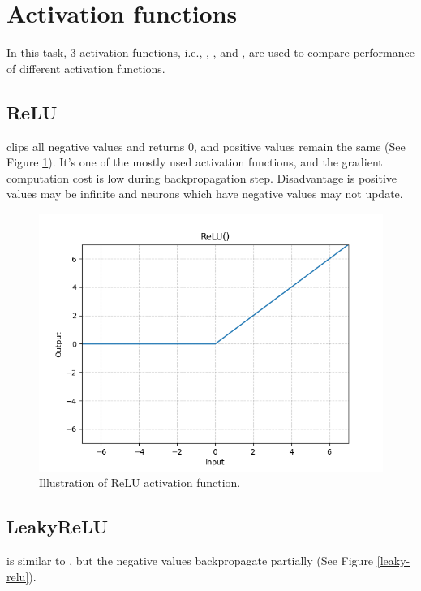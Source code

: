 \section{Activation functions}
\indent
    In this task, 3 activation functions, i.e., , , and , 
    are used to compare performance of different activation functions.

\subsection{ReLU}
\indent
     clips all negative values and returns 0, and positive values remain the same  (See Figure \ref{relu}). 
    It's one of the mostly used activation functions, and the gradient computation cost is low during backpropagation step.
    Disadvantage is positive values may be infinite and neurons which have negative values may not update.

    \begin{figure}[H]
		\centering
		\includegraphics[scale=0.5]{img/relu.png}
		\caption{Illustration of ReLU activation function.}
		\label{relu}
	\end{figure}

\subsection{LeakyReLU}
\indent
     is similar to , but the negative values backpropagate partially (See Figure \ref{leaky-relu}).

